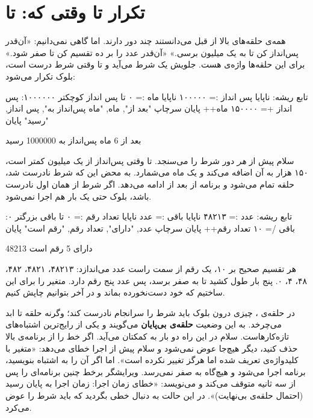 \section{تکرار تا وقتی که: تا}

همه‌ی حلقه‌های بالا از قبل می‌دانستند چند دور دارند. اما گاهی نمی‌دانیم:
«آن‌قدر پس‌انداز کن تا به یک میلیون برسی.» «آن‌قدر عدد را بر ده تقسیم کن تا
صفر شود.» برای این حلقه‌ها واژه‌ی  هست. جلویش یک شرط می‌آید و
تا وقتی شرط درست است، بلوک تکرار می‌شود:

\begin{salamfa}
تابع ریشه:
    ناپایا پس انداز := ۱۰۰۰۰۰
    ناپایا ماه := ۰
    تا پس انداز کوچکتر ۱۰۰۰۰۰۰:
        پس انداز += ۱۵۰۰۰۰
        ماه++
    پایان
    سرچاپ "بعد از", ماه, "ماه پس‌انداز به", پس انداز, "رسید"
پایان
\end{salamfa}

\begin{outputfa}
بعد از 6 ماه پس‌انداز به 1000000 رسید
\end{outputfa}

سلام پیش از \emph{هر} دور شرط را می‌سنجد. تا وقتی پس‌انداز از یک میلیون
کمتر است، ۱۵۰ هزار به آن اضافه می‌کند و یک ماه می‌شمارد. به محض این که شرط
نادرست شد، حلقه تمام می‌شود و برنامه از بعد از  ادامه می‌دهد.
اگر شرط از همان اول نادرست باشد، بلوک حتی یک بار هم اجرا نمی‌شود.

\begin{salamfa}
تابع ریشه:
    عدد := ۴۸۲۱۳
    ناپایا باقی := عدد
    ناپایا تعداد رقم := ۰
    تا باقی بزرگتر ۰:
        باقی /= ۱۰
        تعداد رقم++
    پایان
    سرچاپ عدد, "دارای", تعداد رقم, "رقم است"
پایان
\end{salamfa}

\begin{outputfa}
48213 دارای 5 رقم است
\end{outputfa}

هر تقسیم صحیح بر ۱۰، یک رقم از سمت راست عدد می‌اندازد: ۴۸۲۱۳، ۴۸۲۱، ۴۸۲،
۴۸، ۴، ۰. پنج بار طول کشید تا به صفر برسد، پس عدد پنج رقم دارد. متغیر
 را برای این ساختیم که خود  دست‌نخورده بماند و در
آخر بتوانیم چاپش کنیم.

\begin{warn}
در حلقه‌ی ، چیزی درون بلوک باید شرط را سرانجام نادرست کند؛
وگرنه حلقه تا ابد می‌چرخد. به این وضعیت \textbf{حلقه‌ی بی‌پایان} می‌گویند و
یکی از رایج‌ترین اشتباه‌های تازه‌کارهاست. سلام در این راه دو بار به کمکتان
می‌آید. اگر خط  را از برنامه‌ی بالا حذف کنید، دیگر
هیچ‌جا  عوض نمی‌شود و سلام پیش از اجرا خطای 
می‌دهد: «متغیر  با کلیدواژه‌ی  تعریف شده اما هرگز تغییر نکرده
است». اما اگر آن را به اشتباه  بنویسید، برنامه اجرا
می‌شود و  هیچ‌گاه به صفر نمی‌رسد. ویرایشگر برخط چنین برنامه‌ای
را پس از سه ثانیه متوقف می‌کند و می‌نویسد:
«خطای زمان اجرا: زمان اجرا به پایان رسید (احتمال حلقه‌ی بی‌نهایت)».
در این حالت به دنبال خطی بگردید که باید شرط را عوض می‌کرد.
\end{warn}


